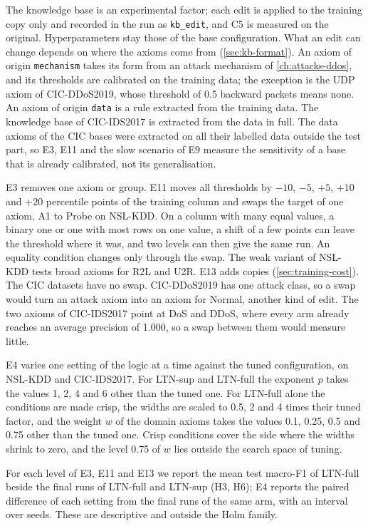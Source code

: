 The knowledge base is an experimental factor; each edit is applied to the training copy only
and recorded in the run as \texttt{kb\_edit}, and C5 is measured on the original. Hyperparameters
stay those of the base configuration. What an edit can change depends on where the axioms come
from (\cref{sec:kb-format}). An axiom of origin \texttt{mechanism} takes its form from an attack
mechanism of \cref{ch:attacks-ddos}, and its thresholds are calibrated on the training data;
the exception is the UDP axiom of CIC-DDoS2019, whose threshold of 0.5 backward packets means
none. An axiom of origin \texttt{data} is a rule extracted from the training data. The
knowledge base of CIC-IDS2017 is extracted from the data in full. The data axioms of the CIC bases
were extracted on all their labelled data outside the test part, so E3, E11 and the slow scenario
of E9 measure the sensitivity of a base that is already calibrated, not its generalisation.

E3 removes one axiom or group. E11 moves all thresholds by $-10$, $-5$, $+5$, $+10$ and $+20$
percentile points of the training column and swaps the target of one axiom, A1 to Probe on
NSL-KDD. On a column with many equal values, a binary one or one with most rows on one value, a
shift of a few points can leave the threshold where it was, and two levels can then give the same
run. An equality condition changes only through the swap. The weak variant of NSL-KDD tests broad
axioms for R2L and U2R. E13 adds copies (\cref{sec:training-cost}). The CIC datasets have no swap.
CIC-DDoS2019 has one attack class, so a swap would turn an attack axiom into an axiom for Normal,
another kind of edit. The two axioms of CIC-IDS2017 point at DoS and DDoS, where every arm already
reaches an average precision of 1.000, so a swap between them would measure little.

E4 varies one setting of the logic at a time against the tuned configuration, on NSL-KDD and
CIC-IDS2017. For LTN-sup and LTN-full the exponent $p$ takes the values 1, 2, 4 and 6 other than the
tuned one. For LTN-full alone the conditions are made crisp, the widths are scaled to 0.5, 2 and 4
times their tuned factor, and the weight $w$ of the domain axioms takes the values 0.1, 0.25, 0.5
and 0.75 other than the tuned one. Crisp conditions cover the side where the widths shrink to zero,
and the level 0.75 of $w$ lies outside the search space of tuning.

For each level of E3, E11 and E13 we report the mean test macro-F1 of LTN-full beside the final
runs of LTN-full and LTN-sup (H3, H6); E4 reports the paired difference of each setting from the
final runs of the same arm, with an interval over seeds. These are descriptive and outside the Holm family.

